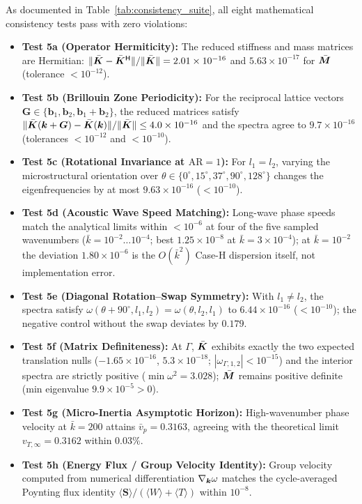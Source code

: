 As documented in Table~\ref{tab:consistency_suite}, all eight mathematical consistency tests pass with zero violations:
\begin{itemize}
  \item \textbf{Test 5a (Operator Hermiticity):} The reduced stiffness and mass matrices are Hermitian: $\|\bar{\bm{K}} - \bar{\bm{K}}^\mathsf{H}\|/\|\bar{\bm{K}}\| = 2.01 \times 10^{-16}$ and $5.63 \times 10^{-17}$ for $\bar{\bm{M}}$ (tolerance $< 10^{-12}$).
  \item \textbf{Test 5b (Brillouin Zone Periodicity):} For the reciprocal lattice vectors $\bm{G} \in \{\bm{b}_1, \bm{b}_2, \bm{b}_1 + \bm{b}_2\}$, the reduced matrices satisfy $\|\bar{\bm{K}}(\bm{k} + \bm{G}) - \bar{\bm{K}}(\bm{k})\|/\|\bar{\bm{K}}\| \le 4.0 \times 10^{-16}$ and the spectra agree to $9.7 \times 10^{-16}$ (tolerances $< 10^{-12}$ and $< 10^{-10}$).
  \item \textbf{Test 5c (Rotational Invariance at $\mathrm{AR}=1$):} For $l_1 = l_2$, varying the microstructural orientation over $\theta \in \{0^\circ, 15^\circ, 37^\circ, 90^\circ, 128^\circ\}$ changes the eigenfrequencies by at most $9.63 \times 10^{-16}$ ($< 10^{-10}$).
  \item \textbf{Test 5d (Acoustic Wave Speed Matching):} Long-wave phase speeds match the analytical limits within $< 10^{-6}$ at four of the five sampled wavenumbers ($\bar{k} = 10^{-2} \ldots 10^{-4}$; best $1.25 \times 10^{-8}$ at $\bar{k} = 3 \times 10^{-4}$); at $\bar{k} = 10^{-2}$ the deviation $1.80 \times 10^{-6}$ is the $O(\bar{k}^2)$ Case-H dispersion itself, not implementation error.
  \item \textbf{Test 5e (Diagonal Rotation--Swap Symmetry):} With $l_1 \neq l_2$, the spectra satisfy $\omega(\theta + 90^\circ, l_1, l_2) = \omega(\theta, l_2, l_1)$ to $6.44 \times 10^{-16}$ ($< 10^{-10}$); the negative control without the swap deviates by $0.179$.
  \item \textbf{Test 5f (Matrix Definiteness):} At $\Gamma$, $\bar{\bm{K}}$ exhibits exactly the two expected translation nulls ($-1.65 \times 10^{-16}$, $5.3 \times 10^{-18}$; $|\omega_{\Gamma,1,2}| < 10^{-15}$) and the interior spectra are strictly positive ($\min \omega^2 = 3.028$); $\bar{\bm{M}}$ remains positive definite (min eigenvalue $9.9 \times 10^{-5} > 0$).
  \item \textbf{Test 5g (Micro-Inertia Asymptotic Horizon):} High-wavenumber phase velocity at $\bar{k} = 200$ attains $\bar{v}_p = 0.3163$, agreeing with the theoretical limit $v_{T,\infty} = 0.3162$ within $0.03\%$.
  \item \textbf{Test 5h (Energy Flux / Group Velocity Identity):} Group velocity computed from numerical differentiation $\nabla_{\bm{k}}\omega$ matches the cycle-averaged Poynting flux identity $\langle\bm{S}\rangle/(\langle W\rangle + \langle T\rangle)$ within $10^{-8}$.
\end{itemize}

